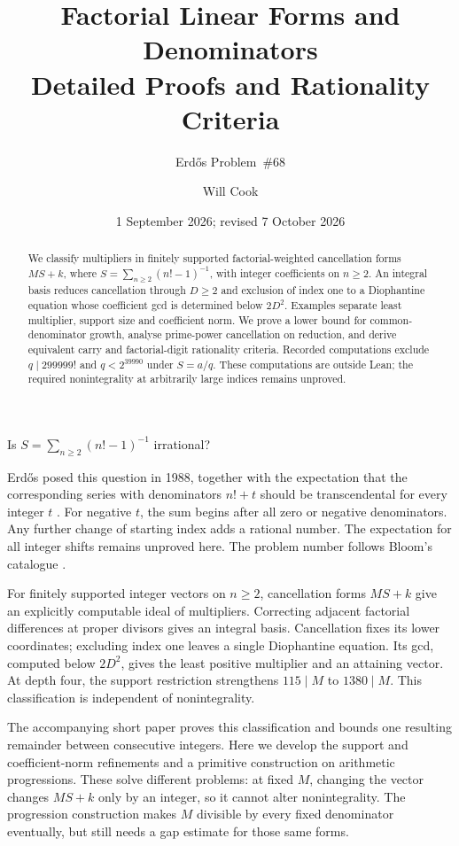 \documentclass[11pt]{article}
\title{Factorial Linear Forms and Denominators\\Detailed Proofs and Rationality Criteria}
\subtitle{Erd\H{o}s Problem~\#68}
\author{Will Cook}
\date{1 September 2026; revised 7 October 2026}
\newcommand{\Ser}{S}
\begin{document}
\maketitle
\noteprovenance

\begin{abstract}
We classify multipliers in finitely supported factorial-weighted
cancellation forms $MS+k$, where $S=\sum_{n\ge2}(n!-1)^{-1}$, with
integer coefficients on $n\ge2$. An integral basis reduces cancellation through
$D\ge2$ and exclusion of index one to a Diophantine equation whose coefficient gcd
is determined below $2D^2$. Examples separate least multiplier, support
size and coefficient norm. We prove a lower bound for common-denominator growth,
analyse prime-power cancellation on reduction, and derive equivalent
carry and factorial-digit rationality criteria.
Recorded computations exclude $q\mid299999!$ and $q<2^{39990}$ under
$S=a/q$. These computations are outside Lean; the required nonintegrality
at arbitrarily large indices remains unproved.
\end{abstract}

\begin{problem}[Erd\H{o}s \#68]\label{long68:res:problem}
Is $\Ser=\sum_{n\ge2}(n!-1)^{-1}$ irrational?
\end{problem}

Erd\H{o}s posed this question in 1988, together with the expectation that
the corresponding series with denominators $n!+t$ should be
transcendental for every integer $t$ \cite[p.~102]{erdos1988}.
For negative $t$, the sum begins after all zero or negative denominators.
Any further change of starting index adds a rational number. The
expectation for all integer shifts remains unproved here.
The problem number follows Bloom's catalogue \cite{bloom}.

For finitely supported integer vectors on $n\ge2$, cancellation forms
$MS+k$ give an explicitly computable ideal of multipliers.
Correcting adjacent factorial differences at proper divisors gives an
integral basis. Cancellation fixes its lower coordinates; excluding
index one leaves a single Diophantine equation. Its gcd, computed below
$2D^2$, gives the least positive multiplier and an attaining vector.
At depth four, the support restriction strengthens $115\mid M$ to
$1380\mid M$. This classification is independent of nonintegrality.

The accompanying short paper proves this classification and bounds one
resulting remainder between consecutive integers. Here we develop the
support and coefficient-norm refinements and a primitive construction
on arithmetic progressions. These solve different problems: at fixed
$M$, changing the vector changes $MS+k$ only by an integer, so it cannot
alter nonintegrality. The progression construction makes $M$ divisible
by every fixed denominator eventually, but still needs a gap estimate
for those same forms.
\end{document}
